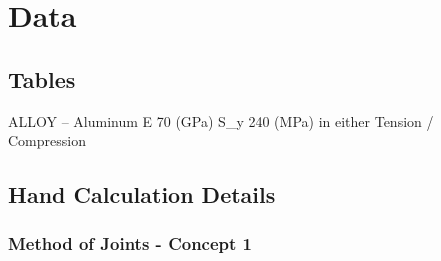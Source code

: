 

\chapter{Data}
\section{Tables}
ALLOY
--
Aluminum
E 70 (GPa)
S_{y} 240 (MPa)
in either Tension / Compression
\section{Hand Calculation Details}
\subsection{Method of Joints - Concept 1}
